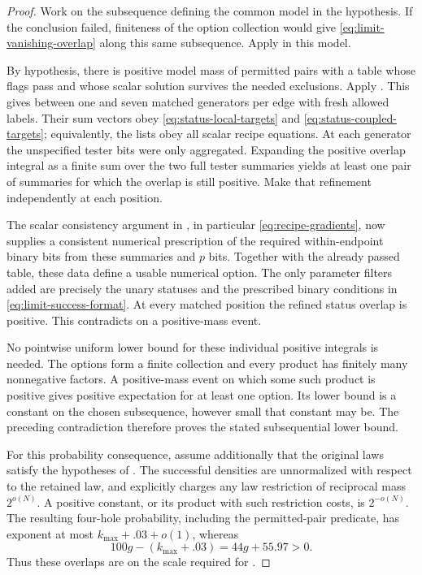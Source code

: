 \begin{proof}
Work on the subsequence defining the common model in the hypothesis.
If the conclusion failed, finiteness of the option collection would
give \eqref{eq:limit-vanishing-overlap} along this same subsequence.
Apply  in this model.

By hypothesis, there is positive model mass of permitted pairs with a
table whose flags pass and whose scalar solution survives the needed
exclusions. Apply . This gives between one and
seven matched generators per edge with fresh allowed labels. Their
sum vectors obey \eqref{eq:status-local-targets} and
\eqref{eq:status-coupled-targets}; equivalently, the lists obey all
scalar recipe equations. At each generator the unspecified tester
bits were only aggregated. Expanding the positive overlap integral
as a finite sum over the two full tester summaries yields at least
one pair of summaries for which the overlap is still positive.
Make that refinement independently at each position.

The scalar consistency argument in
, in particular \eqref{eq:recipe-gradients},
now supplies a consistent numerical prescription of the required
within-endpoint binary bits from these summaries and $p$ bits. Together
with the already passed table, these data define a usable numerical
option. The only parameter filters added are precisely the unary
statuses and the prescribed binary conditions in
\eqref{eq:limit-success-format}. At every matched position the refined
status overlap is positive. This contradicts
 on a positive-mass event.

No pointwise uniform lower bound for these individual positive
integrals is needed. The options form a finite collection and every
product has finitely many nonnegative factors. A positive-mass event
on which some such product is positive gives positive expectation
for at least one option. Its lower bound is a constant on the chosen
subsequence, however small that constant may be. The preceding
contradiction therefore proves the stated subsequential lower bound.

For this probability consequence, assume additionally that the original
laws satisfy the hypotheses of . The successful
densities are unnormalized with respect to the retained law, and
 explicitly charges any law
restriction of reciprocal mass $2^{o(N)}$. A positive constant, or
its product with such restriction costs, is $2^{-o(N)}$. The resulting
four-hole probability, including the permitted-pair predicate, has
exponent at most $k_{\max}+.03+o(1)$, whereas
\[
100g-(k_{\max}+.03)=44g+55.97>0.
\]
Thus these overlaps are on the scale required for
.
\end{proof}


